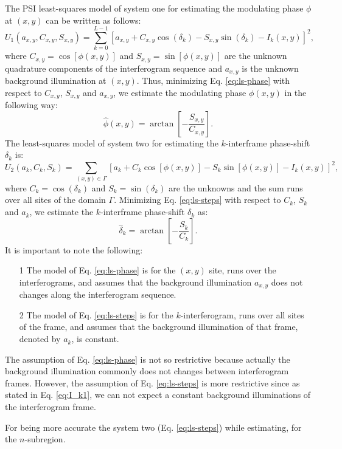 \documentclass[letterpaper,12pt]{article}   %
\begin{document}
The PSI least-squares model of system one for estimating the
modulating phase $\phi$ at $(x,y)$ can be written as follows:
\begin{equation}
  U_1(a_{x,y},C_{x,y},S_{x,y}) = \sum_{k=0}^{L-1}\left[
    a_{x,y}+C_{x,y}\cos(\delta_k)-S_{x,y}\sin(\delta_k)-I_k(x,y)
  \right]^2, \label{eq:ls-phase}
\end{equation} 
where $C_{x,y}=\cos[\phi(x,y)]$ and $S_{x,y}=\sin[\phi(x,y)]$ are the
unknown quadrature components of the interferogram sequence and
$a_{x,y}$ is the unknown background illumination at $(x,y)$. Thus,
minimizing Eq. \eqref{eq:ls-phase} with respect to $C_{x,y}$,
$S_{x,y}$ and $a_{x,y}$, we estimate the modulating phase $\phi(x,y)$
in the following way:
\begin{equation}
  \hat\phi(x,y) = \arctan\left[-\frac{S_{x,y}}{C_{x,y}}\right].
\end{equation}
The least-squares model of system two for estimating the
$k$-interframe phase-shift $\delta_k$ is:
\begin{equation}
  U_2(a_k,C_k,S_k) = \sum_{(x,y)\in \Gamma}\left[
    a_k+C_k\cos[\phi(x,y)]-S_k\sin[\phi(x,y)]-I_k(x,y)
  \right]^2, \label{eq:ls-steps}
\end{equation} 
where $C_k=\cos(\delta_k)$ and $S_k=\sin(\delta_k)$ are the unknowns
and the sum runs over all sites of the domain $\Gamma$. Minimizing
Eq. \eqref{eq:ls-steps} with respect to $C_k$, $S_k$ and $a_k$, we
estimate the $k$-interframe phase-shift $\delta_k$ as:
\begin{equation}
  \hat\delta_k = \arctan\left[-\frac{S_k}{C_k}\right].
\end{equation}
It is important to note the following:
\begin{itemize}
\item[1] The model of Eq. \eqref{eq:ls-phase} is for the $(x,y)$ site,
  runs over the interferograms, and assumes that the background
  illumination $a_{x,y}$ does not changes along the interferogram
  sequence.
\item[2] The model of Eq. \eqref{eq:ls-steps} is for the
  $k$-interferogram, runs over all sites of the frame, and assumes
  that the background illumination of that frame, denoted by $a_k$, is
  constant.
\end{itemize}
The assumption of Eq. \eqref{eq:ls-phase} is not so restrictive
because actually the background illumination commonly does not changes
between interferogram frames. However, the assumption of
Eq. \eqref{eq:ls-steps} is more restrictive since as stated in
Eq. \eqref{eq:I_k1}, we can not expect a constant background
illuminations of the interferogram frame.

For being more accurate the system two (Eq. \eqref{eq:ls-steps}) while
estimating, for the $n$-subregion.

 
\end{document}
